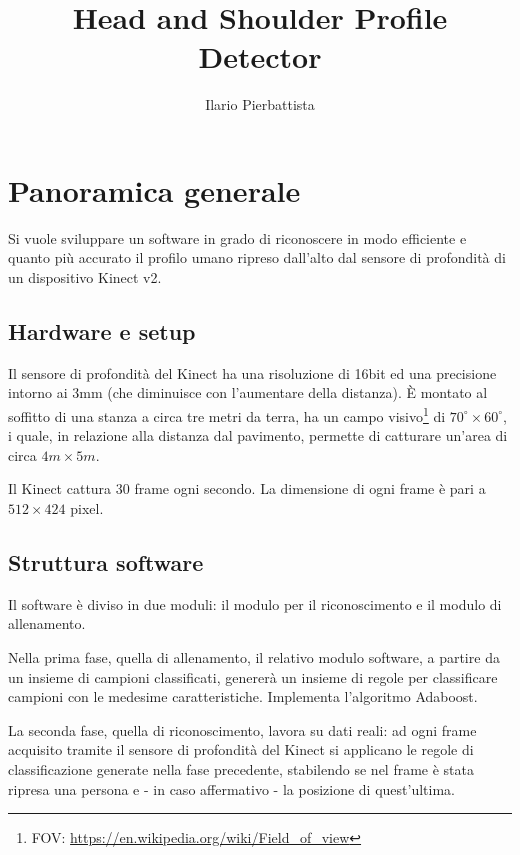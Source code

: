 \documentclass[a4paper,11pt,oneside]{article}
\begin{document}

	\title{Head and Shoulder Profile Detector}
	\author{Ilario Pierbattista}
	\maketitle

	\section{Panoramica generale} %
	\label{sec:panoramica_generale}
		Si vuole sviluppare un software in grado di riconoscere in modo efficiente e quanto più accurato il profilo umano ripreso dall'alto dal sensore di profondità di un dispositivo Kinect v2.

		\subsection{Hardware e setup} %
		\label{sub:hardware_e_setup}
			Il sensore di profondità del Kinect ha una risoluzione di 16bit ed una precisione intorno ai 3mm (che diminuisce con l'aumentare della distanza). È montato al soffitto di una stanza a circa tre metri da terra, ha un campo visivo\footnote{FOV: \url{https://en.wikipedia.org/wiki/Field_of_view}} di $70^{\circ} \times 60^{\circ}$, i quale, in relazione alla distanza dal pavimento, permette di catturare un'area di circa $4m \times 5m$.

			Il Kinect cattura 30 frame ogni secondo. La dimensione di ogni frame è pari a $512 \times 424$ pixel.

		\subsection{Struttura software} %
		\label{sub:struttura_software}
			Il software è diviso in due moduli: il modulo per il riconoscimento e il modulo di allenamento.

			Nella prima fase, quella di allenamento, il relativo modulo software, a partire da un insieme di campioni classificati, genererà un insieme di regole per classificare campioni con le medesime caratteristiche. Implementa l'algoritmo Adaboost.

			La seconda fase, quella di riconoscimento, lavora su dati reali: ad ogni frame acquisito tramite il sensore di profondità del Kinect si applicano le regole di classificazione generate nella fase precedente, stabilendo se nel frame è stata ripresa una persona e - in caso affermativo - la posizione di quest'ultima.
		

\end{document}
